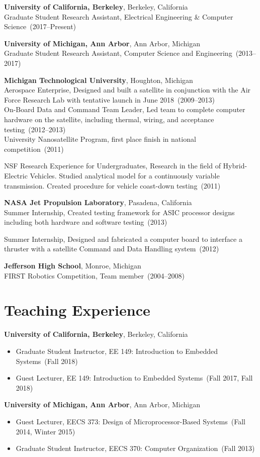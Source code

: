 \documentclass{article}
\begin{document}
{\bf University of California, Berkeley}, Berkeley, California \\
Graduate Student Research Assistant, Electrical Engineering \& Computer Science~(2017--Present)

{\bf University of Michigan, Ann Arbor}, Ann Arbor, Michigan \\
Graduate Student Research Assistant, Computer Science and Engineering~(2013--2017)

{\bf Michigan Technological University}, Houghton, Michigan \\
Aerospace Enterprise, Designed and built a satellite in conjunction with the
Air Force Research Lab with tentative launch in June 2018~(2009--2013) \\
On-Board Data and Command Team Leader, Led team to complete computer hardware
on the satellite, including thermal, wiring, and acceptance testing~(2012--2013) \\
University Nanosatellite Program, first place finish in national competition~(2011)

NSF Research Experience for Undergraduates, Research in the field of
Hybrid-Electric Vehicles. Studied analytical model for a continuously variable
transmission. Created procedure for vehicle coast-down testing~(2011)


{\bf NASA Jet Propulsion Laboratory}, Pasadena, California \\
Summer Internship, Created testing framework for ASIC processor designs
including both hardware and software testing~(2013)

Summer Internship, Designed and fabricated a computer board to interface a
thruster with a satellite Command and Data Handling system~(2012)

{\bf Jefferson High School}, Monroe, Michigan \\
FIRST Robotics Competition, Team member~(2004--2008)


\section*{Teaching Experience}
\vspace{-6pt}
{\bf University of California, Berkeley}, Berkeley, California
\vspace{-6pt}
\begin{itemize}
  \item[] Graduate Student Instructor, EE 149: Introduction to Embedded Systems~(Fall 2018)
  \item[] Guest Lecturer, EE 149: Introduction to Embedded Systems~(Fall 2017, Fall 2018)
\end{itemize}
{\bf University of Michigan, Ann Arbor}, Ann Arbor, Michigan
\vspace{-6pt}
\begin{itemize}
  \item[] Guest Lecturer, EECS 373: Design of Microprocessor-Based Systems~(Fall 2014, Winter 2015)
  \item[] Graduate Student Instructor, EECS 370: Computer Organization~(Fall 2013)
\end{itemize}
\end{document}
